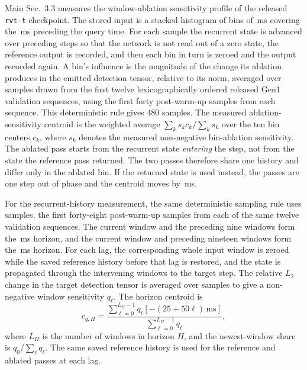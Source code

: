 \documentclass[10pt,twocolumn,letterpaper]{article}
\begin{document}
Main Sec.~3.3 measures the window-ablation sensitivity profile of the released
\texttt{rvt-t} checkpoint. The stored input is a stacked histogram of
\rvtBins{} bins of \rvtBinWidth\,ms covering the \rvtWindow\,ms preceding the
query time. For each sample the recurrent state is advanced over
\rvtWarmSteps{} preceding steps so that the network is not read out of a zero
state, the reference output is recorded, and then each bin in turn is zeroed and
the output recorded again. A bin's influence is the magnitude of the change its
ablation produces in the emitted detection tensor, relative to its norm,
averaged over
\rvtInfluenceSamples{} samples drawn from the first twelve lexicographically
ordered released Gen1 validation sequences, using the first forty post-warm-up
samples from each sequence. This deterministic rule gives 480 samples. The
measured ablation-sensitivity centroid is the weighted average
$\sum_{k}s_{k}c_{k}/\sum_{k}s_{k}$ over the ten bin centers $c_{k}$, where
$s_k$ denotes the measured non-negative bin-ablation sensitivity. The ablated pass starts from the recurrent
state \emph{entering} the step, not from the state the reference pass returned. The two
passes therefore share one history and differ only in the ablated bin. If the
returned state is used instead, the passes are one step out of phase and the centroid
moves by \rvtCentroidDiff\,ms.

For the recurrent-history measurement, the same deterministic sampling rule uses
\histSamples{} samples, the first forty-eight post-warm-up samples from each of the
same twelve validation sequences. The current window and the preceding nine windows
form the \histHorizonA\,ms horizon, and the current window and preceding nineteen windows
form the \histHorizonB\,ms horizon. For each lag, the corresponding whole input window
is zeroed while the saved reference history before that lag is restored, and the state
is propagated through the intervening windows to the target step. The relative $L_{2}$
change in the target detection tensor is averaged over samples to give a non-negative
window sensitivity $q_{\ell}$. The horizon centroid is
\[
c_{q,H}=\frac{\sum_{\ell=0}^{L_H-1}q_{\ell}[-(25+50\ell)\,\mathrm{ms}]}
{\sum_{\ell=0}^{L_H-1}q_{\ell}},
\]
where $L_H$ is the number of windows in horizon $H$, and the newest-window share is
$q_{0}/\sum_{\ell}q_{\ell}$. The same saved reference
history is used for the reference and ablated passes at each lag.
\end{document}
